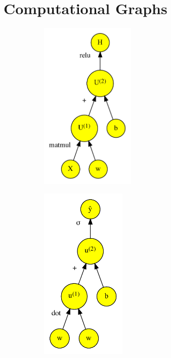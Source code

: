 \documentclass[t]{beamer}
\begin{document}
\section{Computational Graphs}
\begin{frame}
    \begin{figure}
        \centering
        \begin{minipage}{0.45\textwidth}
            \begin{figure}[]
                \centering
                \includegraphics[width=0.5\textwidth]{../plots/computational-graph-c-crop.pdf}
            \end{figure}
        \end{minipage}\hfill
        \begin{minipage}{0.45\textwidth}
            \centering
            \begin{figure}[]
                \includegraphics[width=0.45\textwidth]{../plots/computational-graph-b-crop.pdf}

\end{figure}
\end{minipage}
\end{figure}
\end{frame}
\end{document}
